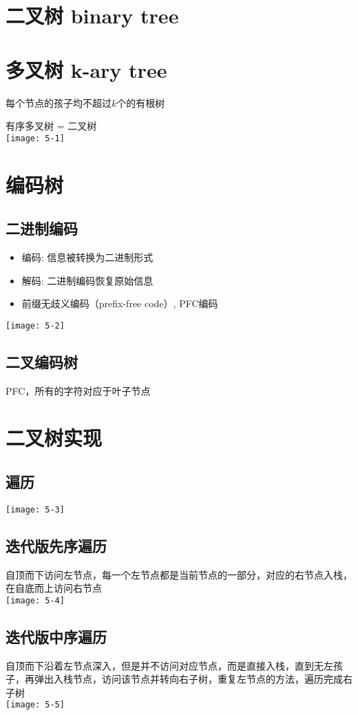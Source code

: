 \section{二叉树 binary tree}

\section{多叉树 k-ary tree}
每个节点的孩子均不超过$k$个的有根树

有序多叉树 = 二叉树\\
\texttt{[image: 5-1]}

\section{编码树}
\subsection{二进制编码}
\begin{itemize}
\item 编码: 信息被转换为二进制形式
\item 解码: 二进制编码恢复原始信息
\item 前缀无歧义编码（prefix-free code）, PFC编码
\end{itemize}
\texttt{[image: 5-2]}


\subsection{二叉编码树}
PFC，所有的字符对应于叶子节点

\section{二叉树实现}
\subsection{遍历}
\texttt{[image: 5-3]}

\subsection{迭代版先序遍历}
自顶而下访问左节点，每一个左节点都是当前节点的一部分，对应的右节点入栈，在自底而上访问右节点\\
\texttt{[image: 5-4]}

\subsection{迭代版中序遍历}
自顶而下沿着左节点深入，但是并不访问对应节点，而是直接入栈，直到无左孩子，再弹出入栈节点，访问该节点并转向右子树，重复左节点的方法，遍历完成右子树\\
\texttt{[image: 5-5]}

